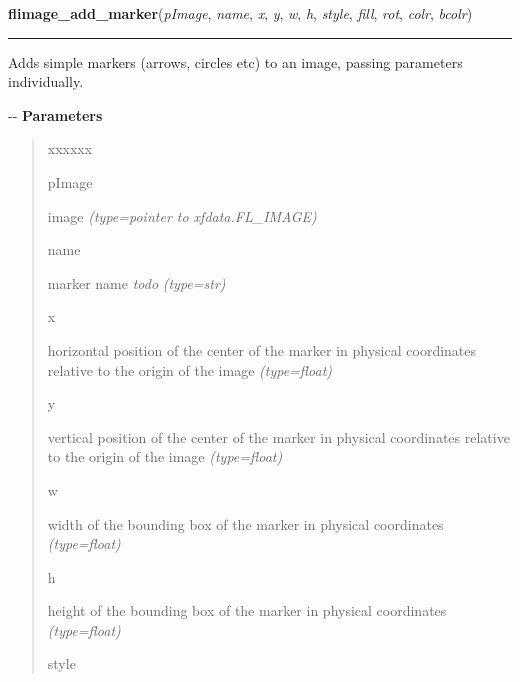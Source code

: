 \hspace{.8\funcindent}\begin{boxedminipage}{\funcwidth}

    \raggedright \textbf{flimage\_add\_marker}(\textit{pImage}, \textit{name}, \textit{x}, \textit{y}, \textit{w}, \textit{h}, \textit{style}, \textit{fill}, \textit{rot}, \textit{colr}, \textit{bcolr})

    \vspace{-1.5ex}

    \rule{\textwidth}{0.5\fboxrule}
\setlength{\parskip}{2ex}

Adds simple markers (arrows, circles etc) to an image, passing
parameters individually.

-{}-
\setlength{\parskip}{1ex}
      \textbf{Parameters}
      \vspace{-1ex}

      \begin{quote}
        \begin{Ventry}{xxxxxx}

          \item[pImage]


image
            {\it (type=pointer to xfdata.FL\_IMAGE)}

          \item[name]


marker name \emph{todo}
            {\it (type=str)}

          \item[x]


horizontal position of the center of the marker in physical
coordinates relative to the origin of the image
            {\it (type=float)}

          \item[y]


vertical position of the center of the marker in physical
coordinates relative to the origin of the image
            {\it (type=float)}

          \item[w]


width of the bounding box of the marker in physical coordinates
            {\it (type=float)}

          \item[h]


height of the bounding box of the marker in physical coordinates
            {\it (type=float)}

          \item[style]



\end{Ventry}
\end{quote}
\end{boxedminipage}
